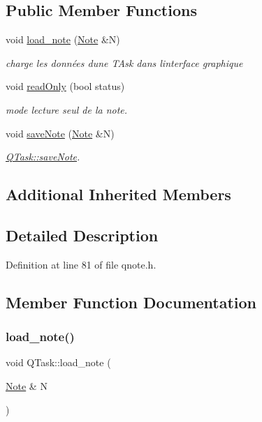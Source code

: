 \subsection*{Public Member Functions}
\begin{DoxyCompactItemize}
\item 
void \hyperlink{class_q_task_a548fc51beaa1dcea345c362782aa11c0}{load\+\_\+note} (\hyperlink{class_note}{Note} \&N)
\begin{DoxyCompactList}\small\item\em charge les données d\textquotesingle{}une T\+Ask dans l\textquotesingle{}interface graphique \end{DoxyCompactList}\item 
void \hyperlink{class_q_task_a1bf9080c14e7a94094bde3fa315d66d9}{read\+Only} (bool status)
\begin{DoxyCompactList}\small\item\em mode lecture seul de la note. \end{DoxyCompactList}\item 
void \hyperlink{class_q_task_ae304b097cdfd1169d2b190bbad3922eb}{save\+Note} (\hyperlink{class_note}{Note} \&N)
\begin{DoxyCompactList}\small\item\em \hyperlink{class_q_task_ae304b097cdfd1169d2b190bbad3922eb}{Q\+Task\+::save\+Note}. \end{DoxyCompactList}\end{DoxyCompactItemize}
\subsection*{Additional Inherited Members}


\subsection{Detailed Description}


Definition at line 81 of file qnote.\+h.



\subsection{Member Function Documentation}
\mbox{\label{class_q_task_a548fc51beaa1dcea345c362782aa11c0}} 
\subsubsection{\texorpdfstring{load\+\_\+note()}{load\_note()}}
{\footnotesize\ttfamily void Q\+Task\+::load\+\_\+note (\begin{DoxyParamCaption}\item[{\hyperlink{class_note}{Note} \&}]{N }\end{DoxyParamCaption})\hspace{0.3cm}{\ttfamily [virtual]}}



